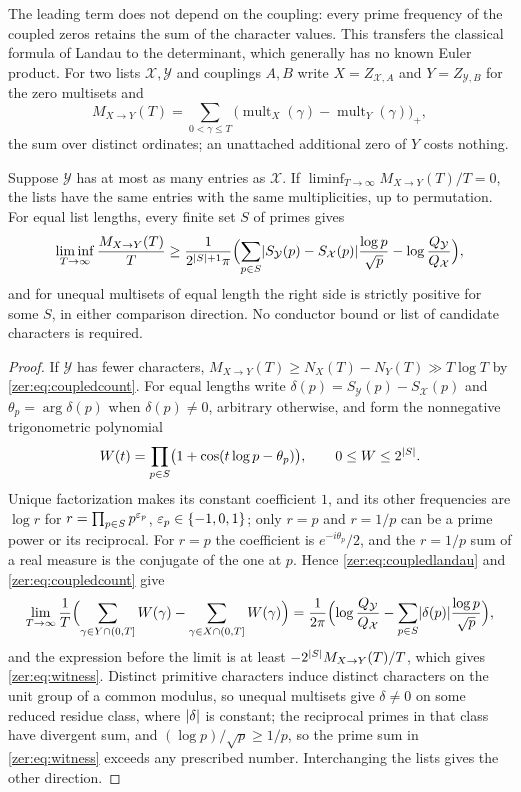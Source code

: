 The leading term does not depend on the coupling: every prime frequency of the coupled zeros retains
the sum of the character values. This transfers the classical formula of Landau
\cite{Landau1911Nullstellen,KaczorowskiLanguascoPerelli2000Note} to the determinant, which generally has no
known Euler product. For two lists $\mathcal X,\mathcal Y$ and couplings $A,B$ write $X=Z_{\mathcal X,A}$ and
$Y=Z_{\mathcal Y,B}$ for the zero multisets and
\[
 M_{X\to Y}(T)=\sum_{0<\gamma\le T}\bigl(\operatorname{mult}_X(\gamma)-\operatorname{mult}_Y(\gamma)\bigr)_+,
\]
the sum over distinct ordinates; an unattached additional zero of $Y$ costs nothing.

\begin{theorem}\label{zer:thm:blindlabels}
Suppose $\mathcal Y$ has at most as many entries as $\mathcal X$. If
$\liminf_{T\to\infty}M_{X\to Y}(T)/T=0$, the lists have the same entries with the same multiplicities, up
to permutation. For equal list lengths, every finite set $S$ of primes gives
\begin{equation}\label{zer:eq:witness}
 \liminf_{T\to\infty}\frac{M_{X\to Y}(T)}T\ge\frac1{2^{\lvert S\rvert+1}\pi}\Bigl(\sum_{p\in S}\lvert S_{\mathcal Y}(p)-S_{\mathcal X}(p)\rvert\frac{\log p}{\sqrt p}-\log\frac{Q_{\mathcal Y}}{Q_{\mathcal X}}\Bigr),
\end{equation}
and for unequal multisets of equal length the right side is strictly positive for some $S$, in either
comparison direction. No conductor bound or list of candidate characters is required.
\end{theorem}
\begin{proof}
If $\mathcal Y$ has fewer characters, $M_{X\to Y}(T)\ge N_X(T)-N_Y(T)\gg T\log T$ by \eqref{zer:eq:coupledcount}.
For equal lengths write $\delta(p)=S_{\mathcal Y}(p)-S_{\mathcal X}(p)$ and $\theta_p=\arg\delta(p)$ when
$\delta(p)\ne0$, arbitrary otherwise, and form the nonnegative trigonometric polynomial
\[
 W(t)=\prod_{p\in S}\bigl(1+\cos(t\log p-\theta_p)\bigr),\qquad0\le W\le2^{\lvert S\rvert}.
\]
Unique factorization makes its constant coefficient $1$, and its other frequencies are $\log r$ for
$r=\prod_{p\in S}p^{\varepsilon_p}$, $\varepsilon_p\in\{-1,0,1\}$; only $r=p$ and $r=1/p$ can be a prime power or its
reciprocal. For $r=p$ the coefficient is $e^{-i\theta_p}/2$, and the $r=1/p$ sum of a real measure is the
conjugate of the one at $p$. Hence \eqref{zer:eq:coupledlandau} and \eqref{zer:eq:coupledcount} give
\[
 \lim_{T\to\infty}\frac1T\Bigl(\sum_{\gamma\in Y\cap(0,T]}W(\gamma)-\sum_{\gamma\in X\cap(0,T]}W(\gamma)\Bigr)
 =\frac1{2\pi}\Bigl(\log\frac{Q_{\mathcal Y}}{Q_{\mathcal X}}-\sum_{p\in S}\lvert\delta(p)\rvert\frac{\log p}{\sqrt p}\Bigr),
\]
and the expression before the limit is at least $-2^{\lvert S\rvert}M_{X\to Y}(T)/T$, which gives
\eqref{zer:eq:witness}. Distinct primitive characters induce distinct characters on the unit group of a
common modulus, so unequal multisets give $\delta\ne0$ on some reduced residue class, where $\lvert\delta\rvert$ is
constant; the reciprocal primes in that class have divergent sum, and $(\log p)/\sqrt p\ge1/p$, so the
prime sum in \eqref{zer:eq:witness} exceeds any prescribed number. Interchanging the lists gives the other
direction.
\end{proof}

